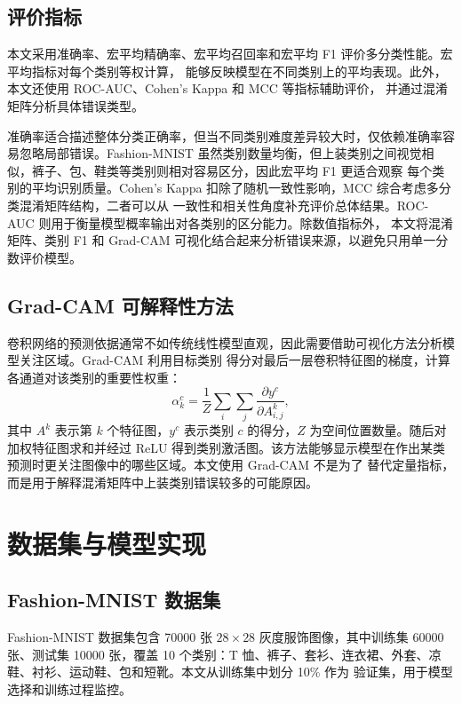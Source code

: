 \documentclass[12pt,a4paper,fontset=fandol]{ctexart}
\numberwithin{figure}{section}
\numberwithin{table}{section}
\numberwithin{equation}{section}
\begin{document}
\subsection{评价指标}
本文采用准确率、宏平均精确率、宏平均召回率和宏平均 F1 评价多分类性能。宏平均指标对每个类别等权计算，
能够反映模型在不同类别上的平均表现。此外，本文还使用 ROC-AUC、Cohen's Kappa 和 MCC 等指标辅助评价，
并通过混淆矩阵分析具体错误类型。

准确率适合描述整体分类正确率，但当不同类别难度差异较大时，仅依赖准确率容易忽略局部错误。Fashion-MNIST
虽然类别数量均衡，但上装类别之间视觉相似，裤子、包、鞋类等类别则相对容易区分，因此宏平均 F1 更适合观察
每个类别的平均识别质量。Cohen's Kappa 扣除了随机一致性影响，MCC 综合考虑多分类混淆矩阵结构，二者可以从
一致性和相关性角度补充评价总体结果。ROC-AUC 则用于衡量模型概率输出对各类别的区分能力。除数值指标外，
本文将混淆矩阵、类别 F1 和 Grad-CAM 可视化结合起来分析错误来源，以避免只用单一分数评价模型。

\subsection{Grad-CAM 可解释性方法}
卷积网络的预测依据通常不如传统线性模型直观，因此需要借助可视化方法分析模型关注区域。Grad-CAM 利用目标类别
得分对最后一层卷积特征图的梯度，计算各通道对该类别的重要性权重：
\begin{equation}
\alpha_k^c=\frac{1}{Z}\sum_i\sum_j\frac{\partial y^c}{\partial A_{i,j}^k},
\end{equation}
其中 $A^k$ 表示第 $k$ 个特征图，$y^c$ 表示类别 $c$ 的得分，$Z$ 为空间位置数量。随后对加权特征图求和并经过
ReLU 得到类别激活图。该方法能够显示模型在作出某类预测时更关注图像中的哪些区域。本文使用 Grad-CAM 不是为了
替代定量指标，而是用于解释混淆矩阵中上装类别错误较多的可能原因。

\section{数据集与模型实现}

\subsection{Fashion-MNIST 数据集}
Fashion-MNIST 数据集包含 70000 张 $28\times28$ 灰度服饰图像，其中训练集 60000 张、测试集 10000 张，覆盖
10 个类别：T 恤、裤子、套衫、连衣裙、外套、凉鞋、衬衫、运动鞋、包和短靴。本文从训练集中划分 10\% 作为
验证集，用于模型选择和训练过程监控。
\end{document}
